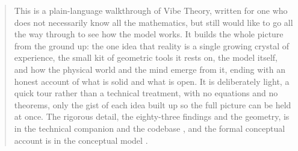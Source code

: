 \begin{abstract}
This is a plain-language walkthrough of Vibe Theory, written for one who does not necessarily know all the mathematics,
but still would like to go all the way through to see how the model works.
It builds the whole picture from the ground up: the one idea that
reality is a single growing crystal of experience, the small kit of geometric tools it rests on,
the model itself, and how the physical world and the mind emerge from it, ending with an honest
account of what is solid and what is open. It is deliberately light, a quick tour rather than a
technical treatment, with no equations and no theorems, only the gist of each idea built up so the
full picture can be held at once. The rigorous detail, the eighty-three findings and the geometry,
is in the technical companion \cite{pollard2026techcompanion} and the codebase
\cite{pollard2026vibetest}, and the formal conceptual account is in the conceptual model
\cite{pollard2026vibeconcept}.
\end{abstract}
